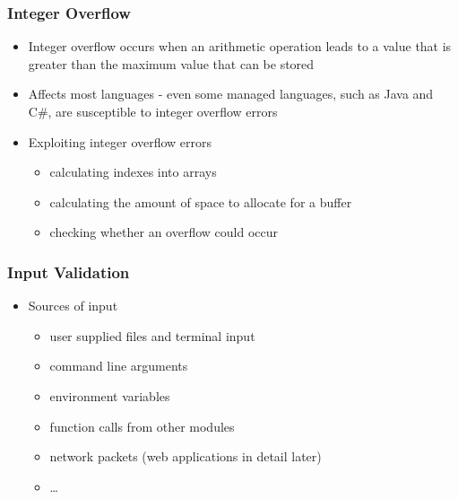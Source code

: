 \documentclass[final]{article}
\begin{document}
\subsubsection*{Integer Overflow}
\begin{itemize}[nosep]
    \item Integer overflow occurs when an arithmetic operation leads to a value that is greater than the maximum value that can be stored
    \item Affects most languages - even some managed languages, such as Java and C\#, are susceptible to integer overflow errors
    \item Exploiting integer overflow errors
          \begin{itemize}[nosep]
              \item calculating indexes into arrays
              \item calculating the amount of space to allocate for a buffer
              \item checking whether an overflow could occur
          \end{itemize}
\end{itemize}
\subsubsection*{Input Validation}
\begin{itemize}[nosep]
    \item Sources of input
          \begin{itemize}[nosep]
              \item user supplied files and terminal input
              \item command line arguments
              \item environment variables
              \item function calls from other modules
              \item network packets (web applications in detail later)
              \item \dots
          \end{itemize}
\end{itemize}
\end{document}
